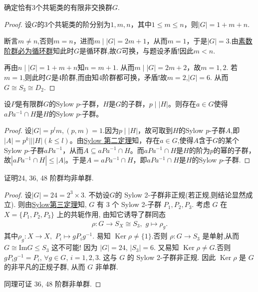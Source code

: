 \documentclass[../../main.tex]{subfiles}%
\begin{document}
\begin{example}
确定恰有3个共轭类的有限非交换群$G$.
\end{example}
\begin{proof}

设$G$的3个共轭类的阶分别为$1,m,n$，其中$1\leqslant m\leqslant n$，则$|G|=1+m+n$.

断言$m\neq n$,否则$m=n$，进而$m\mid |G|=2m+1$，从而$m=1$，于是$|G|=3$.由\hyperref[proposition:素数阶群必为循环群]{素数阶群必为循环群}知此时$G$是循环群,故$G$可换，与题设矛盾!因此$m<n$.

再由$n\mid |G|=1+m+n$知$n=m+1$. 从而$m\mid |G|=2m+2$，故$m=1,2$. 若$m=1$,则此时$G$是4阶群,而由知4阶群都可换，矛盾!故$m=2$,$|G|=6$. 从而$G\cong S_3\cong D_2$.

\end{proof}

\begin{example}
设$P$是有限群$G$的Sylow $p$-子群，$H$是$G$的子群，$p\mid |H|$。则存在$a\in G$使得$aPa^{-1}\cap H$是$H$的Sylow $p$-子群。
\end{example}
\begin{proof}

设$|G|=p^lm,(p,m)=1$.因为$p\mid |H|$，故可取到$H$的Sylow $p$-子群$A$,即$|A|=p^k|||H|(k\leqslant l)$。由\hyperref[theorem:Sylow 第二定理]{Sylow 第二定理}知，存在$a\in G$,使得$A$含于$G$的某个Sylow $p$-子群$aPa^{-1}$，从而$A\subseteq aPa^{-1}\cap H$。而$aPa^{-1}\cap H$是$H$的阶为$p$的幂的子群，故$|aPa^{-1}\cap H|\leqslant |A|$。于是$A = aPa^{-1}\cap H$，即$aPa^{-1}\cap H$是$H$的Sylow $p$-子群.

\end{proof}

\begin{example}
证明24, 36, 48 阶群均非单群.
\end{example}
\begin{proof}

设$|G|=24=2^3\times 3$. 不妨设$G$的 Sylow 2-子群非正规(若正规,则结论显然成立). 则由\hyperref[theorem:Sylow第三定理]{Sylow第三定理}知, $G$ 有 3 个 Sylow 2-子群 $P_1,P_2,P_3$. 考虑 $G$ 在 $X=\{P_1,P_2,P_3\}$ 上的共轭作用, 由知它诱导了群同态
\begin{align*}
\rho:G\to S_X\cong S_3,\,\,g\mapsto \rho_g.
\end{align*}
其中$\rho_g:X\to X,\,\,P_i\mapsto gP_ig^{-1}.$
易知 $\operatorname{Ker}\rho\neq \{1\}$.否则 $\rho:G\to S_3$ 是单射,从而$G\cong \text{Im}G\leqslant S_3$ 这不可能! 因为 $|G|=24$, $|S_3|=6$.
又易知 $\operatorname{Ker}\rho\neq G$.否则 $gP_ig^{-1}=P_i$, $\forall g\in G$, $i=1,2,3$. 这与 $G$ 的 Sylow 2-子群非正规.
因此 $\operatorname{Ker}\rho$ 是 $G$ 的非平凡的正规子群, 从而 $G$ 非单群.

同理可证 36, 48 阶群非单群.

\end{proof}
\end{document}
